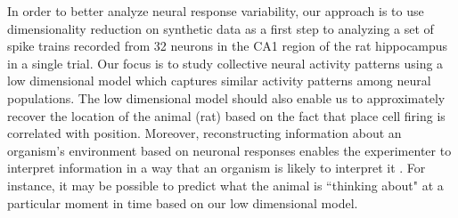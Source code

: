 In order to better analyze neural response variability, our approach is to use dimensionality reduction on synthetic data as a first step to analyzing a set of spike trains recorded from 32 neurons in the CA1 region of the rat hippocampus in a single trial.
Our focus is to study collective neural activity patterns using a low dimensional model which captures similar activity patterns among neural populations. The low dimensional model should also enable us to approximately recover the location of the animal (rat) based on the fact that place cell firing is correlated with position.
Moreover, reconstructing information about an organism's environment based on neuronal responses enables the experimenter to interpret information in a way that an organism is likely to interpret it \cite{Bialek1992}. For instance, it may be possible to predict what the animal is ``thinking about" at a particular moment in time based on our low dimensional model.







































%











